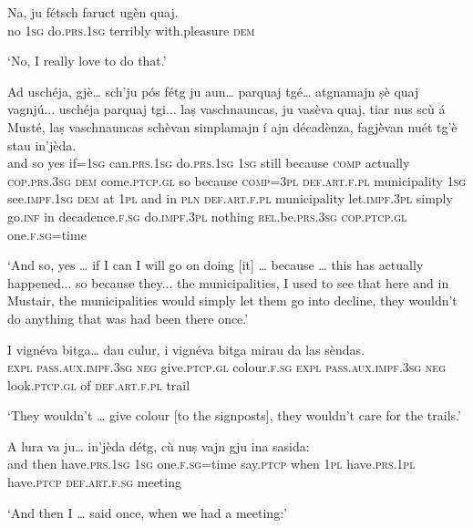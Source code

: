\begin{linenumbers}
\gll Na, ju fétsch faruct ugèn quaj.   \\
no \textsc{1sg} do.\textsc{prs.1sg} terribly with.pleasure \textsc{dem} \\
\end{linenumbers}
\medskip
\glt `No, I really love to do that.'
\medskip

\begin{linenumbers}
\gll  Ad uschéja, gjè… sch’ju pós fétg ju aun… parquaj tgé… atgnamajn ṣè quaj vagnjú... uschéja parquaj tgi... laṣ vaschnauncas, ju vasèva quaj, tiar nus scù á Musté, laṣ vaschnauncas schèvan simplamajn í ajn décadènza, fagjèvan nuét tg’è stau in’jèda.  \\
and so yes if=\textsc{1sg} can.\textsc{prs.1sg} do.\textsc{prs.1sg} \textsc{1sg} still because  \textsc{comp} actually \textsc{cop.prs.3sg} \textsc{dem}  come.\textsc{ptcp.gl} so because \textsc{comp=3pl}  \textsc{def.art.f.pl} municipality \textsc{1sg} see.\textsc{impf.1sg} \textsc{dem}  at \textsc{1pl} and in \textsc{pln} \textsc{def.art.f.pl} municipality let.\textsc{impf.3pl} simply  go.\textsc{inf} in decadence.\textsc{f.sg} do.\textsc{impf.3pl} nothing \textsc{rel.}be.\textsc{prs.3sg} \textsc{cop.ptcp.gl} one.\textsc{f.sg=}time\\
\end{linenumbers}
\medskip
\glt `And so, yes … if I can I will go on doing [it] … because … this has actually happened... so because they... the municipalities, I used to see that here and in Mustair, the municipalities would simply let them go into decline, they wouldn’t do anything that was had been there once.'
\medskip

\begin{linenumbers}
\gll I vignéva bitga… dau culur, i vignéva bitga mirau da las sèndas.   \\
 \textsc{expl} \textsc{pass.aux.impf.3sg} \textsc{neg} give.\textsc{ptcp.gl}  colour.\textsc{f.sg} \textsc{expl} \textsc{pass.aux.impf.3sg} \textsc{neg}  look.\textsc{ptcp.gl} of  \textsc{def.art.f.pl} trail\\
\end{linenumbers}
\medskip
\glt `They wouldn’t … give colour [to the signposts], they wouldn’t care for the trails.'\medskip

\begin{linenumbers}
\gll  A lura va ju… in’jèda détg, cù nuṣ vajn gju ina sasida:  \\
and then have.\textsc{prs.1sg} \textsc{1sg} one.\textsc{f.sg}=time say.\textsc{ptcp} when \textsc{1pl} have.\textsc{prs.1pl} have.\textsc{ptcp} \textsc{def.art.f.sg} meeting  \\
\end{linenumbers}
\medskip
\glt `And then I … said once, when we had a meeting:'
\medskip

